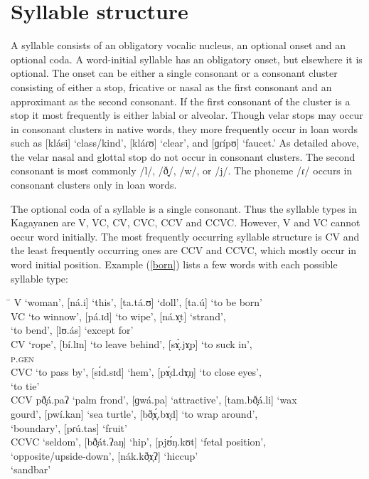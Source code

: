 \section{Syllable structure} 
\label{bkm:Ref360478178}
A syllable consists of an obligatory vocalic nucleus, an optional onset and an optional coda. A word-initial syllable has an obligatory onset, but elsewhere it is optional. The onset can be either a single consonant or a consonant cluster consisting of either a stop, fricative or nasal as the first consonant and an approximant as the second consonant. If the first consonant of the cluster is a stop it most frequently is either labial or alveolar. Though velar stops may occur in consonant clusters in native words, they more frequently occur in loan words such as [klási] ‘class/kind’, [kláɾʊ] ‘clear’, and [ɡɾípʊ] ‘faucet.’ As detailed above, the velar nasal and glottal stop do not occur in consonant clusters. The second consonant is most commonly /l/, /ð̞/, /w/, or /j/. The phoneme /ɾ/ occurs in consonant clusters only in loan words.

The optional coda of a syllable is a single consonant. Thus the syllable types in Kagayanen are V, VC, CV, CVC, CCV and CCVC. However, V and VC cannot occur word initially. The most frequently occurring syllable structure is CV and the least frequently occurring ones are CCV and CCVC, which mostly occur in word initial position. Example (\ref{born}) lists a few words with each possible syllable type:

\ea
\label{born}
\begin{tabbing}
\hspace{1.3cm} \= \kill
V  \> [bá.i] ‘woman’, [ná.i] ‘this’, [ta.tá.ʊ] ‘doll’, [ta.ú] ‘to be born’ \\
VC  \> [tá.ap] ‘to winnow’, [pá.ɪd] ‘to wipe’, [ná.ɤ̞t] ‘strand’, \\
 \> [ba.ʊ́ɡ] ‘to bend’,
 [lʊ.ás] ‘except for’ \\
CV \>  [ka.ð̞át] ‘rope’, [bí.lɪn] ‘to leave behind’, [sɤ̞́.jɤ̞p] ‘to suck in’, \\
 \textsc{p.gen} \\
CVC  ‘to pass by’, [sɪ́d.sɪd] ‘hem’, [pɤ̞́d.dɤ̞ŋ] ‘to close eyes’, \\
 \> [Ɂi.ɡʊ́t] ‘to tie’ \\
CCV \>  pð̞á.paʔ ‘palm frond’, [ɡwá.pa] ‘attractive’, [tam.bð̞á.li] ‘wax \\
  \>  gourd’, [pwí.kan] ‘sea turtle’, [bð̞ɤ̞́.bɤ̞d] ‘to wrap around’, \\ 
 \> [dð̞ú.nan]   ‘boundary’, [pɾú.tas] ‘fruit’ \\
CCVC \>  [tð̞áɡ.sa] ‘seldom’, [bð̞át.ʔaŋ] ‘hip’, [pjʊ́ŋ.kʊt] ‘fetal position’, \\ 
 ‘opposite/upside-down’, [nák.kð̞ɤ̞ʔ] ‘hiccup’ \\
 \> [bð̞ʊ́n.bʊn]   ‘sandbar’
\end{tabbing}
\z

